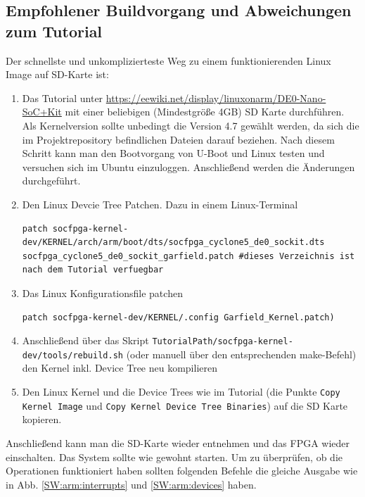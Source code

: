 \subsection{Empfohlener Buildvorgang und Abweichungen zum Tutorial}
Der schnellste und unkomplizierteste Weg zu einem funktionierenden Linux Image auf SD-Karte ist:
\begin{enumerate}
	\item Das Tutorial unter \href{https://eewiki.net/display/linuxonarm/DE0-Nano-SoC+Kit}{https://eewiki.net/display/linuxonarm/DE0-Nano-SoC+Kit} mit einer beliebigen (Mindestgröße 4GB) SD Karte durchführen. Als Kernelversion sollte unbedingt die Version 4.7 gewählt werden, da sich die im Projektrepository befindlichen Dateien darauf beziehen. Nach diesem Schritt kann man den Bootvorgang von U-Boot und Linux testen und versuchen sich im Ubuntu einzuloggen. Anschließend werden die Änderungen durchgeführt.
	\item Den Linux Devcie Tree Patchen. Dazu in einem Linux-Terminal
\lstset{language=bash}
	\begin{lstlisting}[breaklines=true]
patch socfpga-kernel-dev/KERNEL/arch/arm/boot/dts/socfpga_cyclone5_de0_sockit.dts socfpga_cyclone5_de0_sockit_garfield.patch #dieses Verzeichnis ist nach dem Tutorial verfuegbar
	\end{lstlisting}
	\item Das Linux Konfigurationsfile patchen
	\begin{lstlisting}[breaklines=true]
patch socfpga-kernel-dev/KERNEL/.config Garfield_Kernel.patch)
	\end{lstlisting}
	\item Anschließend über das Skript \texttt{TutorialPath/socfpga-kernel-dev/tools/rebuild.sh} (oder manuell über den entsprechenden make-Befehl) den Kernel inkl. Device Tree neu kompilieren
	\item Den Linux Kernel und die Device Trees wie im Tutorial (die Punkte \texttt{Copy Kernel Image} und \texttt{Copy Kernel Device Tree Binaries}) auf die SD Karte kopieren.
\end{enumerate}

Anschließend kann man die SD-Karte wieder entnehmen und das \ac{FPGA} wieder einschalten. Das System sollte wie gewohnt starten. Um zu überprüfen, ob die Operationen funktioniert haben sollten folgenden Befehle die gleiche Ausgabe wie in Abb. \ref{SW:arm:interrupts} und \ref{SW:arm:devices} haben.

